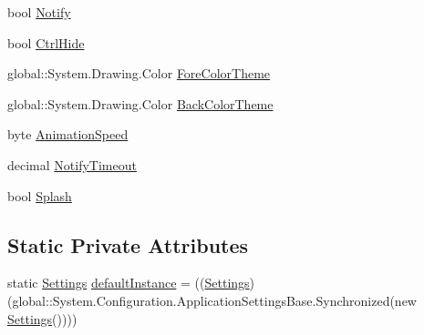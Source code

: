 \begin{DoxyCompactItemize}
\item 
bool \hyperlink{class_sr_p___classroom_inq_1_1_properties_1_1_settings_ad0c83bd5c1a79ad9f1690f5096d48306}{\-Notify}
\item 
bool \hyperlink{class_sr_p___classroom_inq_1_1_properties_1_1_settings_a503512222454f2c3d7bb0dbda6437ac0}{\-Ctrl\-Hide}
\item 
global\-::\-System.\-Drawing.\-Color \hyperlink{class_sr_p___classroom_inq_1_1_properties_1_1_settings_ad3f4ea6ca5ad5d11dc006818a104fb1b}{\-Fore\-Color\-Theme}
\item 
global\-::\-System.\-Drawing.\-Color \hyperlink{class_sr_p___classroom_inq_1_1_properties_1_1_settings_af26cf7b47cfa1a668ce1ebeac8941a18}{\-Back\-Color\-Theme}
\item 
byte \hyperlink{class_sr_p___classroom_inq_1_1_properties_1_1_settings_ac3c244809dca166ec8ee4bf7eb419623}{\-Animation\-Speed}
\item 
decimal \hyperlink{class_sr_p___classroom_inq_1_1_properties_1_1_settings_ab091f12f591ab6ee3a41bc3bbfc441ce}{\-Notify\-Timeout}
\item 
bool \hyperlink{class_sr_p___classroom_inq_1_1_properties_1_1_settings_a4269b3de67539ea156c51e5d1c811a22}{\-Splash}
\end{DoxyCompactItemize}
\subsection*{\-Static \-Private \-Attributes}
\begin{DoxyCompactItemize}
\item 
static \hyperlink{class_sr_p___classroom_inq_1_1_properties_1_1_settings}{\-Settings} \hyperlink{class_sr_p___classroom_inq_1_1_properties_1_1_settings_a0a71ce7c79440c1532000746426ccf1f}{default\-Instance} = ((\hyperlink{class_sr_p___classroom_inq_1_1_properties_1_1_settings}{\-Settings})(global\-::\-System.\-Configuration.\-Application\-Settings\-Base.\-Synchronized(new \hyperlink{class_sr_p___classroom_inq_1_1_properties_1_1_settings}{\-Settings}())))
\end{DoxyCompactItemize}


